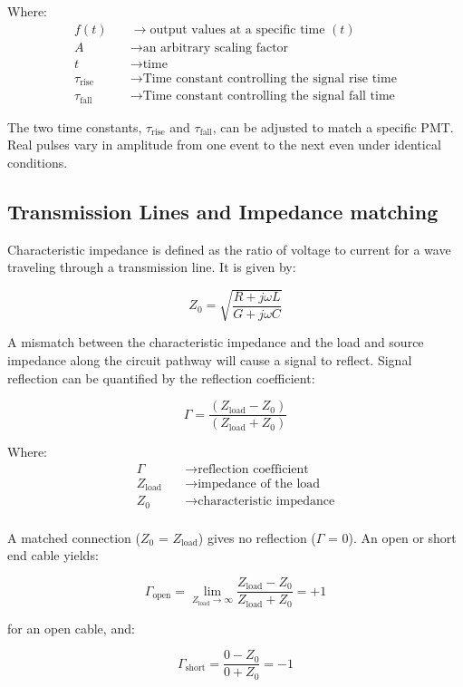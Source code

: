 \documentclass[10pt]{article}
\begin{document}
Where:
\begin{align*}
f(t) &\quad\to \text{output values at a specific time } (t) \\
A    &\quad\to \text{an arbitrary scaling factor} \\
t    &\quad\to \text{time} \\
\tau_{\text{rise}} &\quad\to \text{Time constant controlling the signal rise time}\\
\tau_{\text{fall}} &\quad\to \text{Time constant controlling the signal fall time}
\end{align*}

The two time constants, ${\tau_{\text{rise}}}$ and ${\tau_{\text{fall}}}$, can be adjusted to match a specific PMT. Real pulses vary in amplitude from one event to the next even under identical conditions.

\subsection{Transmission Lines and Impedance matching}
Characteristic impedance is defined as the ratio of voltage to current for a wave traveling through a transmission line. It is given by:

$$Z_0 = \sqrt{\frac{R + j\omega L}{G + j\omega C}}$$


A mismatch between the characteristic impedance and the load and source impedance along the circuit pathway will cause a signal to reflect. Signal reflection can be quantified by the reflection coefficient:

$$
\Gamma = \frac{(Z_{\text{load}} - Z_0)}{(Z_{\text{load}} + Z_0)}
$$

Where:
\begin{align*}
\Gamma &\quad\to \text{reflection coefficient} \\
Z_{\text{load}}    &\quad\to \text{impedance of the load} \\
Z_0    &\quad\to \text{characteristic impedance} \\
\end{align*}

 A matched connection ($Z_0$ = $Z_{\text{load}}$) gives no reflection ($\Gamma$ = 0). An open or short end cable yields:

$$
\Gamma_{\text{open}} = \lim_{Z_{\text{load}} \to \infty} \frac{Z_{\text{load}} - Z_0}{Z_{\text{load}} + Z_0} = +1
$$

for an open cable, and: 

$$
\Gamma_{\text{short}} =  \frac{0- Z_0}{0 + Z_0} = -1
$$
\end{document}
